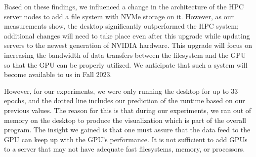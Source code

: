 \documentclass[utf8]{FrontiersinVancouver} %
\begin{document}
Based on these findings, we influenced a change in the architecture of the HPC server nodes to add a file system with NVMe storage on it. However, as our measurements show, the desktop significantly outperformed the HPC system; additional changes will need to take place even after this upgrade while updating servers to the newest generation of NVIDIA hardware. This upgrade will focus on increasing the bandwidth of data transfers between the filesystem and the GPU so that the GPU can be properly utilized. We anticipate that such a system will become available to us in Fall 2023.

However, for our experiments, we were only running the desktop for up to 33 epochs, and the dotted line includes our prediction of the runtime based on our previous values. The reason for this is that during our experiments, we ran out of memory on the desktop to produce the visualization which is part of the overall program. The insight we gained is that one must assure that the data feed to the GPU can keep up with the GPU's performance. It is not sufficient to add GPUs to a server that may not have adequate fast filesystems, memory, or processors.
\end{document}
